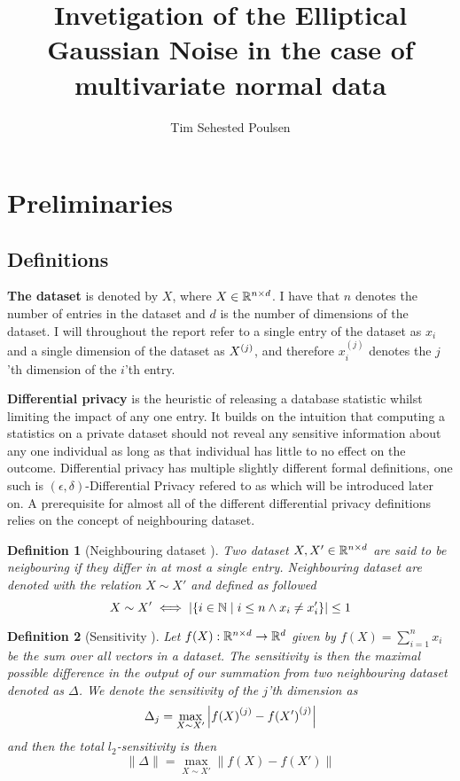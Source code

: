 \documentclass[a4paper,12pt]{article}
\title{Invetigation of the Elliptical Gaussian Noise in the case of multivariate normal data}
\author{Tim Sehested Poulsen}
\newtheorem{definition}{Definition}[section]
\begin{document}
\maketitle

\section{Preliminaries}
\subsection{Definitions}

\textbf{The dataset} is denoted by $X$, where 
$X \in \mathbb{R}^{n \times d}$.
I have that $n$ denotes the number of entries in the dataset and 
$d$ is the number of dimensions of the dataset.
I will throughout the report refer to a single entry of 
the dataset as $x_i$ and a single dimension of the dataset as $X^{(j)}$, 
and therefore $x^{(j)}_i$
denotes the $j$'th dimension of the $i$'th entry.
\vspace*{0.3cm}

\textbf{Differential privacy} is the heuristic of 
releasing a database statistic whilst limiting the impact
of any one entry. It builds on the intuition that computing
a statistics on a private dataset should not reveal 
any sensitive information about any one individual 
as long as that individual has little to no effect on the outcome.
Differential privacy has multiple slightly different
formal definitions, 
one such is $(\epsilon, \delta)$-Differential Privacy
refered to as \edp which will be introduced later on.
A prerequisite for almost all of the different differential privacy
definitions relies on the concept of neighbouring dataset.
\vspace*{0.3cm}

\begin{definition}[Neighbouring dataset \cite{dwork2016}]
Two dataset $X, X' \in \mathbb{R}^{n \times d}$ are said to be 
neigbouring if they differ in at most a single entry.
Neighbouring dataset are denoted with the relation $X \sim X'$ and defined as followed
\[ X \sim X' \iff \left | \left \{ i \in \mathbb{N} \; \text{\textbar} \; i \le n \land x_i \ne x_i' \right\} \right| \le 1 \]
\end{definition}

\begin{definition}[Sensitivity \cite{Lebeda2022}]
Let $f(X): \mathbb{R}^{n \times d} \rightarrow \mathbb{R}^d$ given by 
$f(X) = \sum_{i = 1}^n x_i$ be the sum over all vectors in a dataset.
The sensitivity is then the maximal 
possible difference in the output of our summation  
from two neighbouring dataset denoted as $\Delta$.
We denote the sensitivity of the $j$'th dimension as
\[ \Delta_j = \max_{X \sim X'} \left |{f(X)}^{(j)} - {f(X')}^{(j)}\right| \]
and then the total $l_2$-sensitivity is then
\[ \| \Delta \| = \max_{X \sim X'} \left\| {f(X)} - {f(X')} \right\|  \]
    
\end{definition}
\end{document}
